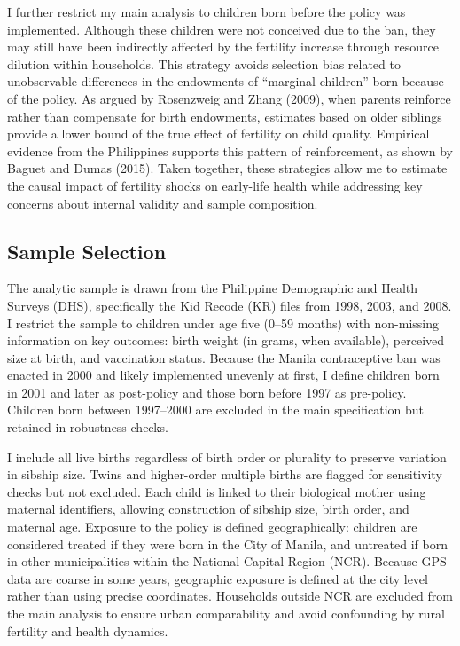 \documentclass[]{AEA}
\begin{document}
I further restrict my main analysis to children born before the policy
was implemented. Although these children were not conceived due to the
ban, they may still have been indirectly affected by the fertility
increase through resource dilution within households. This strategy
avoids selection bias related to unobservable differences in the
endowments of ``marginal children'' born because of the policy. As
argued by Rosenzweig and Zhang (2009), when parents reinforce rather
than compensate for birth endowments, estimates based on older siblings
provide a lower bound of the true effect of fertility on child quality.
Empirical evidence from the Philippines supports this pattern of
reinforcement, as shown by Baguet and Dumas (2015). Taken together,
these strategies allow me to estimate the causal impact of fertility
shocks on early-life health while addressing key concerns about internal
validity and sample composition.

\subsection{Sample Selection}

The analytic sample is drawn from the Philippine Demographic and Health
Surveys (DHS), specifically the Kid Recode (KR) files from 1998, 2003,
and 2008. I restrict the sample to children under age five (0--59
months) with non-missing information on key outcomes: birth weight (in
grams, when available), perceived size at birth, and vaccination status.
Because the Manila contraceptive ban was enacted in 2000 and likely
implemented unevenly at first, I define children born in 2001 and later
as post-policy and those born before 1997 as pre-policy. Children born
between 1997--2000 are excluded in the main specification but retained
in robustness checks.

I include all live births regardless of birth order or plurality to
preserve variation in sibship size. Twins and higher-order multiple
births are flagged for sensitivity checks but not excluded. Each child
is linked to their biological mother using maternal identifiers,
allowing construction of sibship size, birth order, and maternal age.
Exposure to the policy is defined geographically: children are
considered treated if they were born in the City of Manila, and
untreated if born in other municipalities within the National Capital
Region (NCR). Because GPS data are coarse in some years, geographic
exposure is defined at the city level rather than using precise
coordinates. Households outside NCR are excluded from the main analysis
to ensure urban comparability and avoid confounding by rural fertility
and health dynamics.
\end{document}
